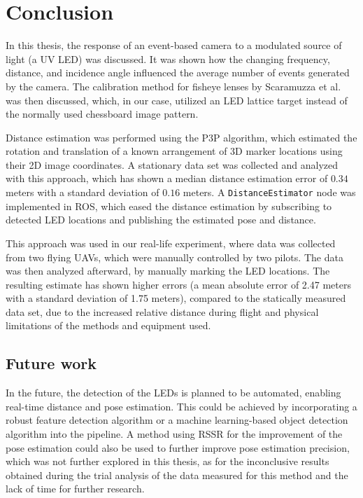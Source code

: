 
\chapter{Conclusion\label{chap:conclusion}}
In this thesis, the response of an event-based camera to a modulated source of light (a \ac{UV} \ac{LED}) was discussed.
It was shown how the changing frequency, distance, and incidence angle influenced the average number of events generated by the camera.
The calibration method for fisheye lenses by Scaramuzza et al.~\cite{scaramuzzacalibration} was then discussed, which, in our case,
utilized an LED lattice target instead of the normally used chessboard image pattern.

Distance estimation was performed using the \ac{P3P} algorithm, which estimated the rotation and translation of a known
arrangement of 3D marker locations using their 2D image coordinates. A stationary data set was collected and analyzed with this
approach, which has shown a median distance estimation error of $0.34$ meters with a standard deviation of $0.16$ meters.
A \texttt{DistanceEstimator} node was implemented in \ac{ROS}, which eased the distance estimation by subscribing
to detected \ac{LED} locations and publishing the estimated pose and distance.

This approach was used in our real-life experiment, where data was collected from two flying \ac{UAV}s, which were manually controlled by two pilots.
The data was then analyzed afterward, by manually marking the \ac{LED} locations. The resulting estimate has shown
higher errors (a mean absolute error of 2.47 meters with a standard deviation of 1.75 meters), compared to the statically measured data set,
due to the increased relative distance during flight and physical limitations of the methods and equipment used.

\section{Future work}
In the future, the detection of the \ac{LED}s is planned to be automated, enabling real-time distance and pose estimation.
This could be achieved by incorporating a robust feature detection algorithm or a machine learning-based object detection
algorithm into the pipeline.
A method using \ac{RSSR} for the improvement of the pose estimation could also be used to further improve pose estimation precision,
which was not further explored in this thesis, as for the inconclusive results obtained during the trial analysis of the data measured for this method and the lack of time for further research.